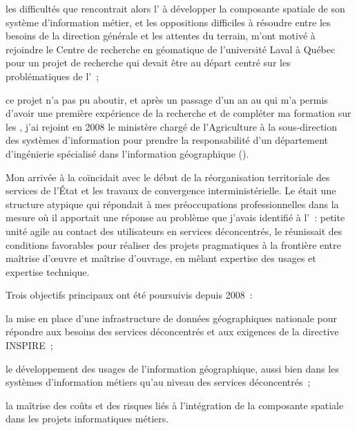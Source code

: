 \item les difficultés que rencontrait alors l'{\ONF}
      à développer la composante spatiale de son
      système d'information métier, et les oppositions
      difficiles à résoudre entre les besoins de la direction générale
      et les attentes du terrain, m'ont motivé à rejoindre
      le Centre de recherche en géomatique de l'université Laval à Québec
      pour un projet de recherche qui devait être au départ
      centré sur les problématiques de l'{\ONF}~;

\item ce projet n'a pas pu aboutir,
      et après un passage d'un an au {\CRG} qui m'a permis
      d'avoir une première expérience de la recherche et de
      compléter ma formation sur les {\SIG}, j'ai rejoint en 2008 le ministère
      chargé de l'Agriculture à la sous-direction des systèmes 
      d'information pour prendre la responsabilité
      d'un département d'ingénierie spécialisé dans
      l'information géographique ({\DIG}).

\stopitemize

Mon arrivée à la {\SDSI}
coïncidait avec le début de la réorganisation territoriale
des services de l'État et les travaux de convergence
interministérielle.
Le {\DIG} était une structure atypique qui répondait à mes préoccupations professionnelles
dans la mesure où il apportait une réponse au problème que j'avais identifié à l'{\ONF}~:
petite unité agile au contact des utilisateurs en services déconcentrés,
le {\DIG} réunissait des conditions favorables pour réaliser des projets pragmatiques à la frontière
entre maîtrise d’œuvre et maîtrise d'ouvrage,
en mêlant expertise des usages et expertise technique.

Trois objectifs principaux ont été poursuivis depuis 2008~:

\startitemize

\item la mise en place d'une infrastructure
      de données géographiques nationale pour répondre aux besoins
      des services déconcentrés et aux exigences
      de la directive INSPIRE~;

\item le développement des usages de l'information géographique,
      aussi bien dans les systèmes d'information métiers
      qu'au niveau des services déconcentrés~;

\item la maîtrise des coûts et des risques
      liés à l'intégration de la composante spatiale
      dans les projets informatiques métiers.

